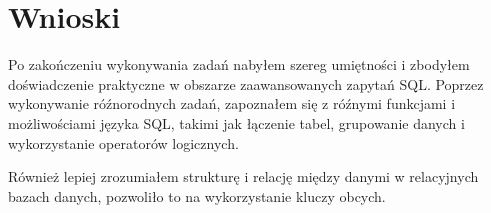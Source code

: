 \documentclass[a4paper, 10pt]{article}
\begin{document}
\section{Wnioski}

Po zakończeniu wykonywania zadań nabyłem szereg umiętności i zbodyłem doświadczenie praktyczne w obszarze zaawansowanych zapytań SQL. Poprzez wykonywanie róźnorodnych zadań, zapoznałem się z róźnymi funkcjami i możliwościami języka SQL, takimi jak łączenie tabel, grupowanie danych i wykorzystanie operatorów logicznych.

Również lepiej zrozumiałem strukturę i relację między danymi w relacyjnych bazach danych, pozwoliło to na wykorzystanie kluczy obcych.
\end{document}
